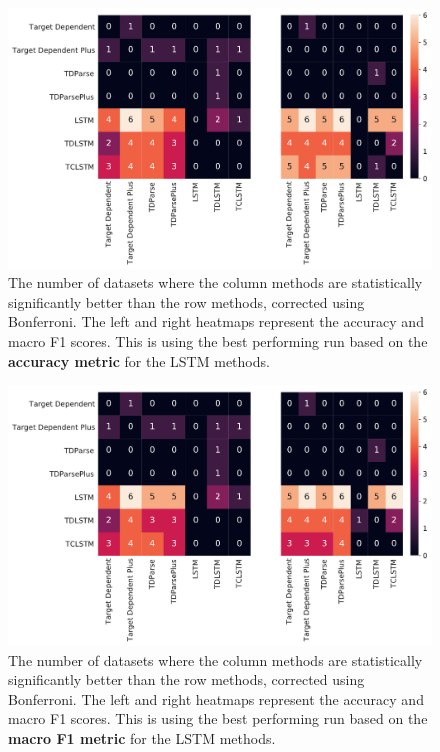 \begin{figure}[!h]
    \centering
    \includegraphics[scale=0.4]{images/reproducibility/Sig_Max_Acc_Test.pdf}
    \caption{The number of datasets where the column methods are statistically significantly better than the row methods, corrected using Bonferroni. The left and right heatmaps represent the accuracy and macro F1 scores. This is using the best performing run based on the \textbf{accuracy metric} for the LSTM methods.}
    \label{figure:repro_mass_eval_max_acc_test_sig_results}
\end{figure}

\begin{figure}[!h]
    \centering
    \includegraphics[scale=0.4]{images/reproducibility/Sig_Max_F1_Test.pdf}
    \caption{The number of datasets where the column methods are statistically significantly better than the row methods, corrected using Bonferroni. The left and right heatmaps represent the accuracy and macro F1 scores. This is using the best performing run based on the \textbf{macro F1 metric} for the LSTM methods.}
    \label{figure:repro_mass_eval_max_f1_test_sig_results}
\end{figure}

